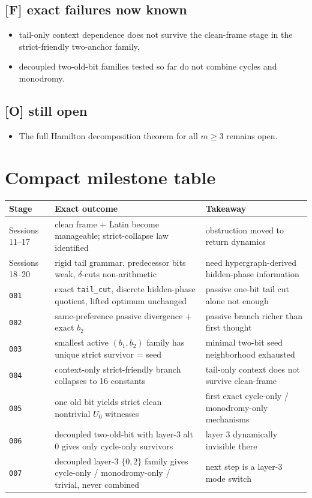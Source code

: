 \documentclass[11pt]{article}
\begin{document}
\subsection*{[F] exact failures now known}
\begin{itemize}
    \item tail-only context dependence does not survive the clean-frame stage in the strict-friendly two-anchor family,
    \item decoupled two-old-bit families tested so far do not combine cycles and monodromy.
\end{itemize}

\subsection*{[O] still open}
\begin{itemize}
    \item The full Hamilton decomposition theorem for all $m\ge 3$ remains open.
\end{itemize}

\section*{Compact milestone table}

\begin{longtable}{>{\raggedright\arraybackslash}p{} >{\raggedright\arraybackslash}p{} >{\raggedright\arraybackslash}p{}}
\toprule
Stage & Exact outcome & Takeaway \\
\midrule
\endhead
Sessions 11--17 & clean frame + Latin become manageable; strict-collapse law identified & obstruction moved to return dynamics \\
Sessions 18--20 & rigid tail grammar, predecessor bits weak, $\delta$-cuts non-arithmetic & need hypergraph-derived hidden-phase information \\
\texttt{001} & exact \texttt{tail\_cut}, discrete hidden-phase quotient, lifted optimum unchanged & passive one-bit tail cut alone not enough \\
\texttt{002} & same-preference passive divergence + exact $b_2$ & passive branch richer than first thought \\
\texttt{003} & smallest active $(b_1,b_2)$ family has unique strict survivor = seed & minimal two-bit seed neighborhood exhausted \\
\texttt{004} & context-only strict-friendly branch collapses to 16 constants & tail-only context does not survive clean-frame \\
\texttt{005} & one old bit yields strict clean nontrivial $U_0$ witnesses & first exact cycle-only / monodromy-only mechanisms \\
\texttt{006} & decoupled two-old-bit with layer-3 alt $0$ gives only cycle-only survivors & layer 3 dynamically invisible there \\
\texttt{007} & decoupled layer-3 $\{0,2\}$ family gives cycle-only / monodromy-only / trivial, never combined & next step is a layer-3 mode switch \\
\bottomrule
\end{longtable}
\end{document}
